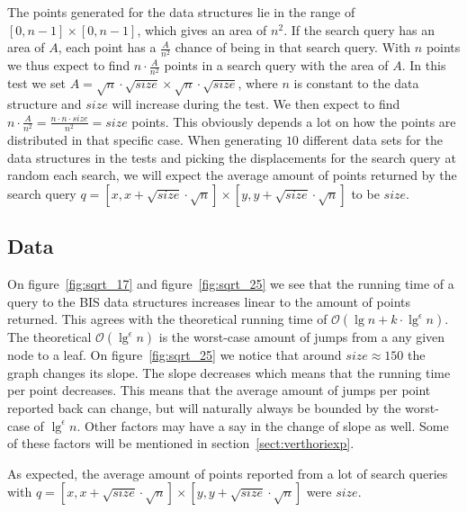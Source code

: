 The points generated for the data structures lie in the range of $[0,n-1] \times [0,n-1]$, which gives an area of $n^2$. If the search query has an area of $A$, each point has a $\frac{A}{n^2}$ chance of being in that search query. With $n$ points we thus expect to find $n\cdot \frac{A}{n^2}$ points in a search query with the area of $A$. In this test we set $A = \sqrt{n}\cdot\sqrt{size}\times\sqrt{n}\cdot\sqrt{size}$, where $n$ is constant to the data structure and $size$ will increase during the test. We then expect to find $n\cdot\frac{A}{n^2} = \frac{n\cdot n \cdot size}{n^2} = size$ points. This obviously depends a lot on how the points are distributed in that specific case. When generating $10$ different data sets for the data structures in the tests and picking the displacements for the search query at random each search, we will expect the average amount of points returned by the search query $q = [x, x+\sqrt{size}\cdot\sqrt{n}] \times [y, y+\sqrt{size}\cdot\sqrt{n}]$ to be $size$.

\subsection{Data}

On figure~\ref{fig:sqrt_17} and figure~\ref{fig:sqrt_25} we see that the running time of a query to the BIS data structures increases linear to the amount of points returned. This agrees with the theoretical running time of $\mathcal{O}(\lg n + k\cdot \lg^\epsilon n)$. The theoretical $\mathcal{O}(\lg^\epsilon n)$ is the worst-case amount of jumps from a any given node to a leaf. On figure~\ref{fig:sqrt_25} we notice that around $size\approx 150$ the graph changes its slope. The slope decreases which means that the running time per point decreases. This means that the average amount of jumps per point reported back can change, but will naturally always be bounded by the worst-case of $\lg^\epsilon n$. Other factors may have a say in the change of slope as well. Some of these factors will be mentioned in section~\ref{sect:verthoriexp}.

\noindent As expected, the average amount of points reported from a lot of search queries with $q = [x, x + \sqrt{size}\cdot\sqrt{n}] \times [y, y + \sqrt{size}\cdot\sqrt{n}]$ were $size$. \\


